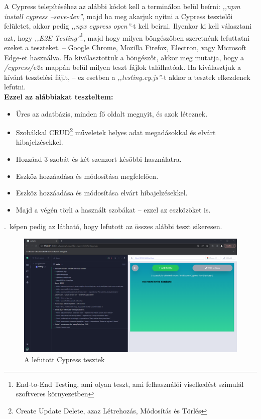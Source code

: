 \documentclass[
]{thesis-ekf}
\theoremstyle{definition}
\theoremstyle{remark}
\begin{document}
	A Cypress telepítéséhez az alábbi kódot kell a terminálon belül beírni: \emph{,,npm install cypress --save-dev''}, majd ha meg akarjuk nyitni a Cypress tesztelői felületet, akkor pedig \emph{,,npx cypress open''}-t kell beírni. Ilyenkor ki kell választani azt, hogy \emph{,,E2E Testing''}\footnote{End-to-End Testing, ami olyan teszt, ami felhasználói viselkedést szimulál szoftveres környezetben}, majd hogy milyen böngészőben szeretnénk lefuttatni ezeket a teszteket. -- Google Chrome, Mozilla Firefox, Electron, vagy Microsoft Edge-et használva. Ha kiválasztottuk a böngészőt, akkor meg mutatja, hogy a \emph{/cypress/e2e} mappán belül milyen teszt fájlok találhatóak. Ha kiválasztjuk a kívánt tesztelési fájlt, -- ez esetben a \emph{,,testing.cy.js''}-t akkor a tesztek elkezdenek lefutni.\\
	\textbf{Ezzel az alábbiakat teszteltem:}\\
	\begin{itemize}
		\item Üres az adatbázis, minden fő oldalt megnyit, és azok léteznek.
		\item Szobákkal CRUD\footnote{Create Update Delete, azaz Létrehozás, Módosítás és Törlés} műveletek helyes adat megadásokkal és elvárt hibajelzésekkel.
		\item Hozzáad 3 szobát és két szenzort későbbi használatra.
		\item Eszköz hozzáadása és módosítása megfelelően.
		\item Eszköz hozzáadása és módosítása elvárt hibajelzésekkel.
		\item Majd a végén törli a használt szobákat -- ezzel az eszközöket is.
	\end{itemize}
	.~képen pedig az látható, hogy lefutott az összes alábbi teszt sikeresen.
	
	\begin{figure}[ht!]
		\centering
		\includegraphics[width=1\textwidth]{./src/pages_img/cypress}
		\caption{A lefutott Cypress tesztek}
		\label{cypress-test}
	\end{figure}
\end{document}
